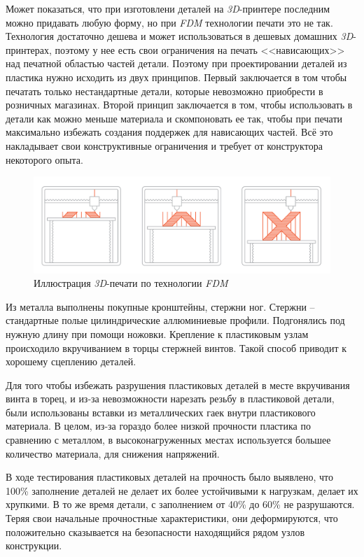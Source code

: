 Может показаться, что при изготовлени деталей на \textit{3D}-принтере последним можно придавать любую форму, но при \textit{FDM} технологии печати это не так. Технология достаточно дешева и может использоваться в дешевых домашних \textit{3D}-принтерах, поэтому у нее есть свои ограничения на печать <<нависающих>> над печатной областью частей детали. Поэтому при проектировании деталей из пластика нужно исходить из двух принципов. Первый заключается в том чтобы печатать только нестандартные детали, которые невозможно приобрести в розничных магазинах. Второй принцип заключается в том, чтобы использовать в детали как можно меньше материала и скомпоновать ее так, чтобы при печати максимально избежать создания поддержек для нависающих частей. Всё это накладывает свои конструктивные ограничения и требует от конструктора некоторого опыта.

\begin{figure}[h]
    \centering
    \includegraphics[scale=0.3]{chapter_mechanics_construction/figure1.png}
    \caption{Иллюстрация \textit{3D}-печати по технологии \textit{FDM}}
    \label{}
\end{figure}

Из металла выполнены покупные кронштейны, стержни ног. Стержни -- стандартные полые цилиндрические аллюминиевые профили. Подгонялись под нужную длину при помощи ножовки. Крепление к пластиковым узлам происходило вкручиванием в торцы стержней винтов. Такой способ приводит к хорошему сцеплению деталей.

Для того чтобы избежать разрушения пластиковых деталей в месте вкручивания винта в торец, и из-за невозможности нарезать резьбу в пластиковой детали, были использованы вставки из металлических гаек внутри пластикового материала. В целом, из-за гораздо более низкой прочности пластика по сравнению с металлом, в высоконагруженных местах используется большее количество материала, для снижения напряжений.

\newpage
В ходе тестирования пластиковых деталей на прочность было выявлено, что 100\% заполнение деталей не делает их более устойчивыми к нагрузкам, делает их хрупкими. В то же время детали, с заполнением от 40\% до 60\% не разрушаются. Теряя свои начальные прочностные характеристики, они деформируются, что положительно сказывается на безопасности находящийся рядом узлов конструкции.

